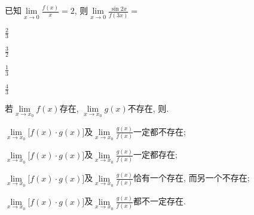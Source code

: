 \begin{problem}
	已知$\displaystyle \lim\limits_{x \rightarrow 0}\frac{f(x)}{x} = 2$, 则$\displaystyle \lim\limits_{x \rightarrow 0}\frac{\sin 2x}{f(3x)} =$
		
		\begin{abcd} 
			\item $\displaystyle \frac{2}{3}$
			
			\item $\displaystyle \frac{3}{2}$
			
			\item $\displaystyle \frac{1}{3}$
			
			\item $\displaystyle \frac{4}{3}$
			
		\end{abcd}
		
		
	\end{problem} \begin{problem}
	若$\lim\limits_{x \rightarrow x_{0}}f(x)$存在, $\lim\limits_{x \rightarrow x_{0}}g(x)$不存在, 则.
		
		\begin{abcd} 
			\item
			$\displaystyle \lim\limits_{x \rightarrow x_{0}}\lbrack f(x) \cdot g(x)\rbrack$及$\displaystyle \lim\limits_{x \rightarrow x_{0}}\frac{g(x)}{f(x)}$一定都不存在;
			
			\item
			$\displaystyle \lim\limits_{x \rightarrow x_{0}}\lbrack f(x) \cdot g(x)\rbrack$及$\displaystyle \lim\limits_{x \rightarrow x_{0}}\frac{g(x)}{f(x)}$一定都存在;
			
			\item
			$\displaystyle \lim\limits_{x \rightarrow x_{0}}\lbrack f(x) \cdot g(x)\rbrack$及$\displaystyle \lim\limits_{x \rightarrow x_{0}}\frac{g(x)}{f(x)}$恰有一个存在, 而另一个不存在;
			
			\item
			$\displaystyle \lim\limits_{x \rightarrow x_{0}}\lbrack f(x) \cdot g(x)\rbrack$及$\displaystyle \lim\limits_{x \rightarrow x_{0}}\frac{g(x)}{f(x)}$都不一定存在.
			
		\end{abcd}
		
		
	\end{problem} 

